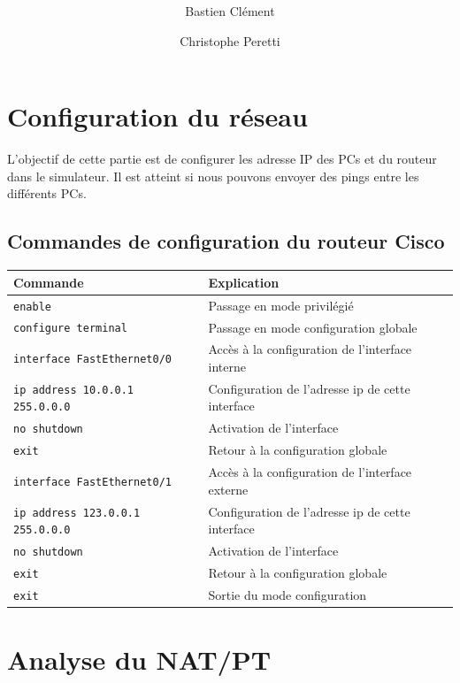 \documentclass[11pt,a4paper]{article}
\author{Bastien Clément \and Christophe Peretti}
\title{{\normalsize \doccourse} \\ \doctitle }
\begin{document}
\maketitle

\section{Configuration du réseau}

L'objectif de cette partie est de configurer les adresse IP des PCs et du routeur dans le simulateur. Il est atteint si nous pouvons envoyer des pings entre les différents PCs.

\subsection{Commandes de configuration du routeur Cisco}

\begin{tabular}{|l|l|}
	\hline	
	\textbf{Commande} & \textbf{Explication}  \\
	\hline
	\texttt{enable} & Passage en mode privilégié\\
	\texttt{configure terminal} & Passage en mode configuration globale\\
	\hline
	\texttt{interface FastEthernet0/0} & Accès à la configuration de l'interface interne\\
	\texttt{ip address 10.0.0.1 255.0.0.0} & Configuration de l'adresse ip de cette interface\\
	\texttt{no shutdown} & Activation de l'interface \\
	\texttt{exit} & Retour à la configuration globale \\
	\hline
	\texttt{interface FastEthernet0/1} & Accès à la configuration de l'interface externe \\
	\texttt{ip address 123.0.0.1 255.0.0.0} & Configuration de l'adresse ip de cette interface \\
	\texttt{no shutdown} & Activation de l'interface \\
	\texttt{exit} & Retour à la configuration globale \\
	\hline
	\texttt{exit} & Sortie du mode configuration \\
	\hline
\end{tabular}


\section{Analyse du NAT/PT}
\end{document}
